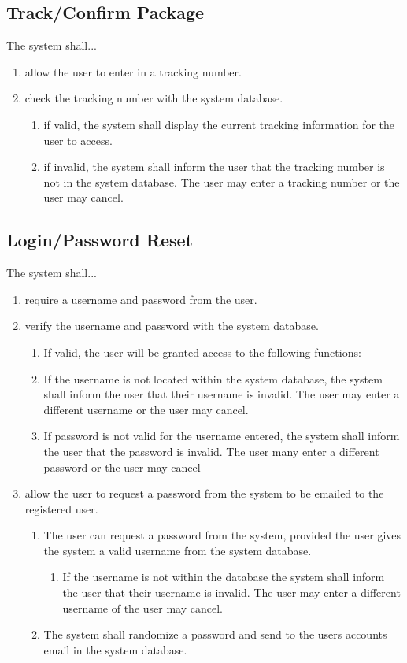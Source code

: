\documentclass{scrreprt}
\begin{document}
\subsection{Track/Confirm Package}

The system shall...

\begin{enumerate}
\item allow the user to enter in a tracking number.
\item check the tracking number with the system database.
\begin{enumerate}
\item if valid, the system shall display the current tracking information for
the user to access.
\item if invalid, the system shall inform the user that the tracking number is
not in the system database. The user may enter a tracking number or the user
may cancel. 
\end{enumerate}
\end{enumerate}

\subsection{Login/Password Reset}

The system shall...

\begin{enumerate}
\item require a username and password from the user.
\item verify the username and password with the system database.
\begin{enumerate}
\item If valid, the user will be granted access to the following functions:
\item If the username is not located within the system database, the system
shall inform the user that their username is invalid. The user may enter a
different username or the user may cancel.
\item If password is not valid for the username entered, the system shall
inform the user that the password is invalid. The user many enter a different
password or the user may cancel 
\end{enumerate}
\item allow the user to request a password from the system to be emailed to the
registered user.
\begin{enumerate}
\item The user can request a password from the system, provided the user gives
the system a valid username from the system database.
\begin{enumerate}
\item If the username is not within the database the system shall inform the
user that their username is invalid. The user may enter a different username of
the user may cancel.
\end{enumerate}
\item The system shall randomize a password and send to the users accounts
email in the system database.
\end{enumerate}
\end{enumerate}
\end{document}
